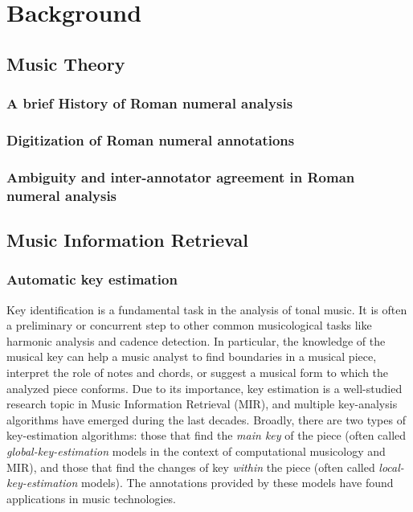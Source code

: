 \chapter{Background}
\label{chap:chap2}


\section{Music Theory}
\subsection{A brief History of Roman numeral analysis}
\subsection{Digitization of Roman numeral annotations}
\subsection{Ambiguity and inter-annotator agreement in Roman numeral analysis}

\section{Music Information Retrieval}
\subsection{Automatic key estimation}

Key identification is a fundamental task in the analysis of tonal music. 
It is often a preliminary or concurrent step to other common musicological tasks like harmonic analysis and cadence detection. 
In particular, the knowledge of the musical key can help a music analyst to find boundaries in a musical piece, interpret the role of notes and chords, or suggest a musical form to which the analyzed piece conforms.
Due to its importance, key estimation is a well-studied research topic in Music Information Retrieval (MIR), and multiple key-analysis algorithms have emerged during the last decades. 
Broadly, there are two types of key-estimation algorithms: those that find the \emph{main key} of the piece (often called \emph{global-key-estimation} models in the context of computational musicology and MIR), and those that find the changes of key \emph{within} the piece (often called \emph{local-key-estimation} models). The annotations provided by these models have found applications in music technologies.

